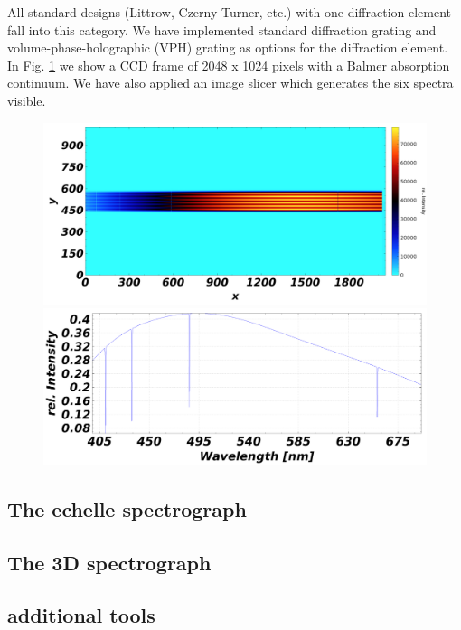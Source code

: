 \documentclass[preprint,12pt,authoryear]{elsarticle}
\begin{document}
All standard designs (Littrow, Czerny-Turner, etc.) with one diffraction element fall into this category. We have implemented standard diffraction grating
and volume-phase-holographic (VPH) grating as options for the diffraction element. In Fig. \ref{Fig1} we show a CCD frame of 2048 x 1024 pixels with
a Balmer absorption continuum. We have also applied an image slicer which generates the six spectra visible. 

\begin{figure}[]
 \begin{center}
 \includegraphics[trim=0cm 0cm 4cm 0cm, clip=true, width=120mm]{./clbalmer.pdf}
 \includegraphics[width=120mm]{./clspec.pdf}
\end{center}
 \caption{}
  \label{Fig1}
  \end{figure}

\subsection{The echelle spectrograph}

\subsection{The 3D spectrograph}

\subsection{additional tools}
\end{document}
